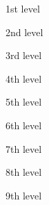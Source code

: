 \documentclass{article}
\begin{document}
\begin{myEnumerate}
\item 1st level
    \begin{myEnumerate}
    \item 2nd level
        \begin{myEnumerate}
        \item 3rd level
            \begin{myEnumerate}
            \item 4th level
                \begin{myEnumerate}
                \item 5th level
                    \begin{myEnumerate}
                    \item 6th level
                        \begin{myEnumerate}
                        \item 7th level
                            \begin{myEnumerate}
                            \item 8th level
                                \begin{myEnumerate}
                                \item 9th level
                                \end{myEnumerate}
                            \end{myEnumerate}
                        \end{myEnumerate}
                    \end{myEnumerate}
                \end{myEnumerate}
            \end{myEnumerate}
        \end{myEnumerate}
    \end{myEnumerate}
\end{myEnumerate}
\end{document}
